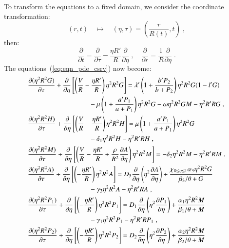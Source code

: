 \documentclass{amsart}
\theoremstyle{definition}
\theoremstyle{remark}
\numberwithin{equation}{section}
\numberwithin{figure}{section}
\newcommand{\po}[1]{\frac{\partial}{\partial{#1}}}
\newcommand{\pp}[2]{\frac{\partial {#1}}{\partial {#2}}}
\begin{document}
To transform the equations to a fixed domain, we consider the coordinate transformation:
\begin{equation}\label{eq:eqn_transf}
(r,t)\quad\mapsto\quad(\eta,\tau) = \left(\frac{r}{R(t)},t\right)\;,
\end{equation}
then:
\begin{equation}\label{eq:eqn_transf_rule}
\po{t} = \po{\tau} - \frac{\eta R'}{R}\po{\eta}\;,\quad
\po{r} = \frac{1}{R}\po{\eta}\;.
\end{equation}
The equations~(\ref{eq:eqn_pde_csrv}) now become:
\begin{subequations}\label{eq:eqn_pde}
\begin{align}
\label{eq:eqn_pde_g}
&\pp{(\eta^2R^2G)}{\tau} + \po{\eta}\left[\left(\frac{V}{R}-\frac{\eta R'}{R}\right)\eta^2R^2G\right] = \lambda'\left(1+\frac{b'P_2}{b+P_2}\right) \eta^2R^2G(1-l'G) \\
\notag
&\hspace*{1.25in} - \mu\left(1+\frac{a'P_1}{a+P_1}\right) \eta^2R^2G - \omega \eta^2R^2GM - \eta^2R'RG\;, \\
\label{eq:eqn_pde_h}
&\pp{(\eta^2R^2H)}{\tau} + \po{\eta}\left[\left(\frac{V}{R}-\frac{\eta R'}{R}\right)\eta^2R^2H\right] = \mu\left(1+\frac{a'P_1}{a+P_1}\right) \eta^2R^2G \\
\notag
&\hspace*{1.25in} - \delta_1 \eta^2R^2H - \eta^2R'RH\;, \\
\label{eq:eqn_pde_m}
&\pp{(\eta^2R^2M)}{\tau} + \po{\eta}\left[\left(\frac{V}{R}-\frac{\eta R'}{R}+\frac{\rho}{R^2}\pp{A}{\eta}\right)\eta^2R^2M\right] = - \delta_2 \eta^2R^2M - \eta^2R'RM\;, \\
\label{eq:eqn_pde_a}
&\pp{(\eta^2R^2A)}{\tau} + \po{\eta}\left[\left(-\frac{\eta R'}{R}\right)\eta^2R^2A\right] = D_3\po{\eta}\left(\eta^2\pp{A}{\eta}\right) + \frac{\chi_{0\le \eta\le 1}\alpha_3\eta^2R^2G}{\beta_3/\theta+G} \\
\notag
&\hspace*{1.25in} - \gamma_3\eta^2R^2A - \eta^2R'RA\;, \\
\label{eq:eqn_pde_p1}
&\pp{(\eta^2R^2P_1)}{\tau} + \po{\eta}\left[\left(-\frac{\eta R'}{R}\right)\eta^2R^2P_1\right] = D_1\po{\eta}\left(\eta^2\pp{P_1}{\eta}\right) + \frac{\alpha_1\eta^2R^2M}{\beta_1/\theta+M} \\
\notag
&\hspace*{1.25in} - \gamma_1\eta^2R^2P_1 - \eta^2R'RP_1\;, \\
\label{eq:eqn_pde_p2}
&\pp{(\eta^2R^2P_2)}{\tau} + \po{\eta}\left[\left(-\frac{\eta R'}{R}\right)\eta^2R^2P_2\right] = D_2\po{\eta}\left(\eta^2\pp{P_2}{\eta}\right) + \frac{\alpha_2\eta^2R^2M}{\beta_2/\theta+M} \\

\end{align}
\end{subequations}
\end{document}

